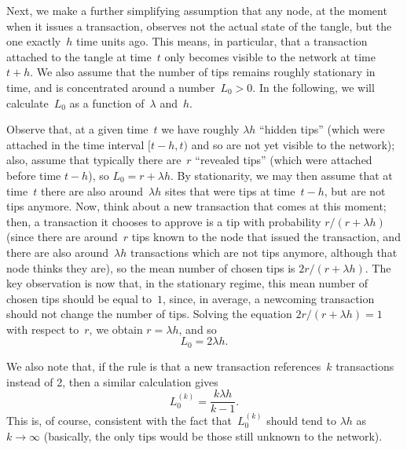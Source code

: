 \documentclass[12pt]{article}
\begin{document}
\begin{CJK}{UTF8}{bkai}
Next, we make a further simplifying assumption that any node,
at the moment when it issues a transaction, observes not the 
actual state of the tangle, but the one exactly~$h$ time units
ago. This means, in particular, that a transaction
attached to the tangle at time~$t$ only becomes 
visible to the network at time~$t+h$. We also assume 
that the number of tips remains roughly stationary
in time, and is concentrated around a number~$L_0>0$.
In the following, we will calculate~$L_0$ as
a function of~$\lambda$ and~$h$. 

Observe that,
at a given time~$t$ we have roughly $\lambda h$ ``hidden tips'' 
(which were attached in the time interval $[t-h,t)$ 
 and so are not yet visible to the network);
also, assume that typically there are~$r$ ``revealed tips'' 
 (which were attached before time $t-h$), 
so $L_0 = r+ \lambda h$. 
By stationarity, we may then assume that at time~$t$ there 
are also around~$\lambda h$ sites that were tips at time~$t-h$, 
 but are not tips anymore. 
Now, think about a new transaction that comes at this moment;
then, a transaction it chooses to approve is a tip 
with probability $r/(r+\lambda h)$ (since there are around~$r$
tips known to the node that issued the transaction,
and there are also around~$\lambda h$ transactions which are not 
tips anymore, although that node thinks they are), 
so the mean number of chosen tips is $2r/(r+\lambda h)$. 
The key observation is now that, in the stationary regime,
this mean number of chosen tips should be equal to~$1$,
since, in average, a newcoming transaction should not change
the number of tips.
Solving the equation $2r/(r+\lambda h)=1$ with respect to~$r$, 
we obtain $r=\lambda h$, and so 
\begin{equation}
\label{L0_def} 
L_0 = 2\lambda h.
\end{equation}

We also note that,
if the rule is that a new transaction references~$k$ 
transactions instead of 2, then a similar calculation gives
\begin{equation}
\label{L0k_def} 
 L_0^{(k)} = \frac{k\lambda h}{k-1}.
\end{equation}
This is, of course, consistent with the fact that~$L_0^{(k)}$ 
should tend to $\lambda h$ as $k\to\infty$ (basically, the 
only tips would be those still unknown to the network).




\end{CJK}
\end{document}
